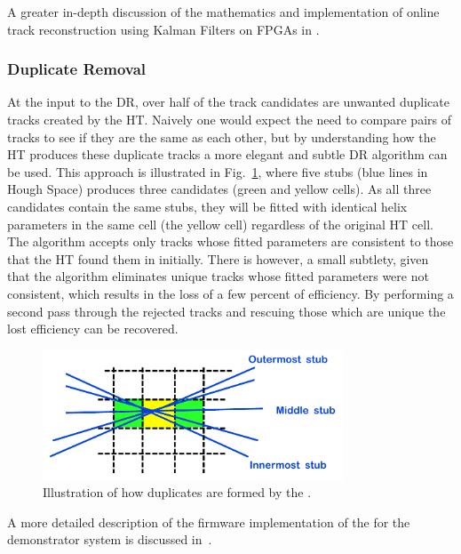 A greater in-depth discussion of the mathematics and implementation of online track reconstruction using Kalman Filters on FPGAs in \cite{SSummers}.

\subsubsection{Duplicate Removal}
At the input to the DR, over half of the track candidates are unwanted duplicate tracks created by the HT.
Naively one would expect the need to compare pairs of tracks to see if they are the same as each other, but by understanding how the HT produces these duplicate tracks a more elegant and subtle DR algorithm can be used.
This approach is illustrated in Fig.~\ref{fig:DR}, where five stubs (blue lines in Hough Space) produces three candidates (green and yellow cells).
As all three candidates contain the same stubs, they will be fitted with identical helix parameters in the same cell (the yellow cell) regardless of the original HT cell.
The algorithm accepts only tracks whose fitted parameters are consistent to those that the HT found them in initially. There is however, a small subtlety, given that the algorithm eliminates unique tracks whose fitted parameters were not consistent, which results in the loss of a few percent of efficiency. 
By performing a second pass through the rejected tracks and rescuing those which are unique the lost efficiency can be recovered.

\begin{figure}[!h]
\centering
\includegraphics[width=0.80\textwidth]{figs/tk-upgrade/A50_algo.pdf}
\caption{Illustration of how duplicates are formed by the \rphi \HT.}
\label{fig:DR}
\end{figure}

A more detailed description of the firmware implementation of the \DR for the demonstrator system is discussed in~\cite{TMTT_JINST}.

